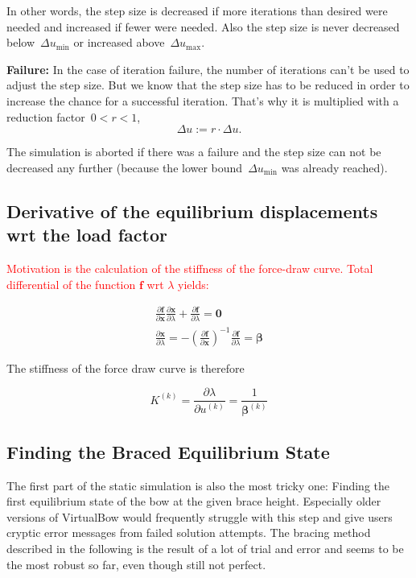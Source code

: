 In other words, the step size is decreased if more iterations than desired were needed and increased if fewer were needed.
Also the step size is never decreased below~$\Delta u_\mathrm{min}$ or increased above~$\Delta u_\mathrm{max}$.

\textbf{Failure:} In the case of iteration failure, the number of iterations can't be used to adjust the step size.
But we know that the step size has to be reduced in order to increase the chance for a successful iteration.
That's why it is multiplied with a reduction factor~$0 < r < 1$,
%
$$
\Delta u := r \cdot \Delta u.
$$

The simulation is aborted if there was a failure and the step size can not be decreased any further (because the lower bound~$\Delta u_\mathrm{min}$ was already reached).

\subsection{Derivative of the equilibrium displacements wrt the load factor}

\textcolor{red}{Motivation is the calculation of the stiffness of the force-draw curve. Total differential of the function $\boldsymbol{f}$ wrt $\lambda$ yields:}

\begin{align}
\frac{\partial \boldsymbol{f}}{\partial \boldsymbol{x}}\frac{\partial \boldsymbol{x}}{\partial \lambda} + \frac{\partial \boldsymbol{f}}{\partial \lambda} = \boldsymbol{0} \\
\frac{\partial \boldsymbol{x}}{\partial \lambda} = -\left(\frac{\partial \boldsymbol{f}}{\partial \boldsymbol{x}}\right)^{-1}\frac{\partial \boldsymbol{f}}{\partial \lambda} = \boldsymbol{\beta}
\end{align}

The stiffness of the force draw curve is therefore

\begin{equation}
K^{(k)} = \frac{\partial \lambda}{\partial u^{(k)}} = \frac{1}{\boldsymbol{\beta}^{(k)}}
\end{equation}

\newpage
\subsection{Finding the Braced Equilibrium State}

The first part of the static simulation is also the most tricky one: Finding the first equilibrium state of the bow at the given brace height.
Especially older versions of VirtualBow would frequently struggle with this step and give users cryptic error messages from failed solution attempts.
The bracing method described in the following is the result of a lot of trial and error and seems to be the most robust so far, even though still not perfect.

